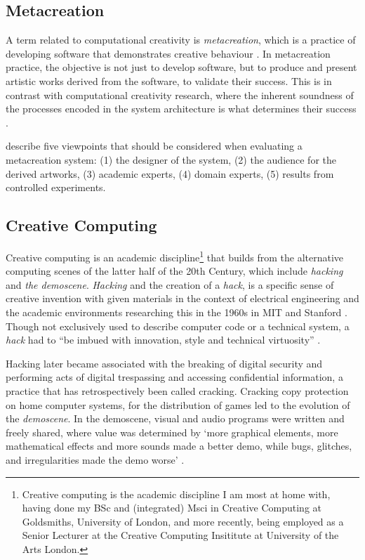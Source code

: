 \subsection{Metacreation}

A term related to computational creativity is \textit{metacreation}, which is a practice of developing software that demonstrates creative behaviour \citep{whitelaw2004metacreation}. 
In metacreation practice, the objective is not just to develop software, but to produce and present artistic works derived from the software, to validate their success. 
This is in contrast with computational creativity research, where the inherent soundness of the processes encoded in the system architecture is what determines their success \citep{colton2008creativity}.

\cite{eigenfeldt2012evaluating} describe five viewpoints that should be considered when evaluating a metacreation system: (1) the designer of the system, (2) the audience for the derived artworks, (3) academic experts, (4) domain experts, (5) results from controlled experiments.  

\subsection{Creative Computing}

Creative computing is an academic discipline\footnote{Creative computing is the academic discipline I am most at home with, having done my BSc and (integrated) Msci in Creative Computing at Goldsmiths, University of London, and more recently, being employed as a Senior Lecturer at the Creative Computing Insititute at University of the Arts London.}
that builds from the alternative computing scenes of the latter half of the 20th Century, which include  \textit{hacking} and \textit{the demoscene}. 
\textit{Hacking} and the creation of a \textit{hack}, is a specific sense of creative invention with given materials in the context of electrical engineering and the academic environments researching this in the 1960s in MIT and Stanford \citep{wark2006hackers}. 
Though not exclusively used to describe computer code or a technical system, a \textit{hack} had to ``be imbued with innovation, style and technical virtuosity'' \citep{levy1984hackers}.

Hacking later became associated with the breaking of digital security and performing acts of digital trespassing and accessing confidential information, a practice that has retrospectively been called cracking. 
Cracking copy protection on home computer systems, for the distribution of games led to the evolution of the \textit{demoscene}. In the demoscene,  visual and audio programs were written and freely shared, where value was determined by ‘more graphical elements, more mathematical effects and more sounds made a better demo, while bugs, glitches, and irregularities made the demo worse’ \citep{carlsson2019forgotten}.

